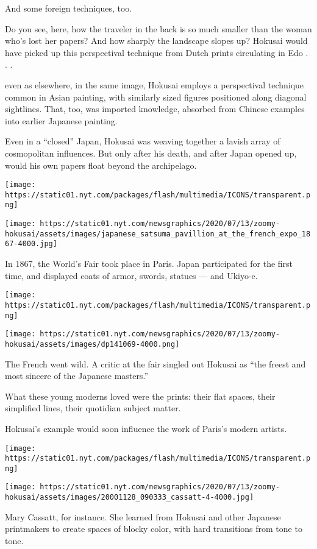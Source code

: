 And some foreign techniques, too.

Do you see, here, how the traveler in the back is so much smaller than
the woman who's lost her papers? And how sharply the landscape slopes
up? Hokusai would have picked up this perspectival technique from Dutch
prints circulating in Edo . . .

even as elsewhere, in the same image, Hokusai employs a perspectival
technique common in Asian painting, with similarly sized figures
positioned along diagonal sightlines. That, too, was imported knowledge,
absorbed from Chinese examples into earlier Japanese painting.

Even in a ``closed'' Japan, Hokusai was weaving together a lavish array
of cosmopolitan influences. But only after his death, and after Japan
opened up, would his own papers float beyond the archipelago.

\texttt{[image: https://static01.nyt.com/packages/flash/multimedia/ICONS/transparent.png]}

\texttt{[image: https://static01.nyt.com/newsgraphics/2020/07/13/zoomy-hokusai/assets/images/japanese\_satsuma\_pavillion\_at\_the\_french\_expo\_1867-4000.jpg]}

In 1867, the World's Fair took place in Paris. Japan participated for
the first time, and displayed coats of armor, swords, statues --- and
Ukiyo-e.

\texttt{[image: https://static01.nyt.com/packages/flash/multimedia/ICONS/transparent.png]}

\texttt{[image: https://static01.nyt.com/newsgraphics/2020/07/13/zoomy-hokusai/assets/images/dp141069-4000.png]}

The French went wild. A critic at the fair singled out Hokusai as ``the
freest and most sincere of the Japanese masters.''

What these young moderns loved were the prints: their flat spaces, their
simplified lines, their quotidian subject matter.

Hokusai's example would soon influence the work of Paris's modern
artists.

\texttt{[image: https://static01.nyt.com/packages/flash/multimedia/ICONS/transparent.png]}

\texttt{[image: https://static01.nyt.com/newsgraphics/2020/07/13/zoomy-hokusai/assets/images/20001128\_090333\_cassatt-4-4000.jpg]}

Mary Cassatt, for instance. She learned from Hokusai and other Japanese
printmakers to create spaces of blocky color, with hard transitions from
tone to tone.

